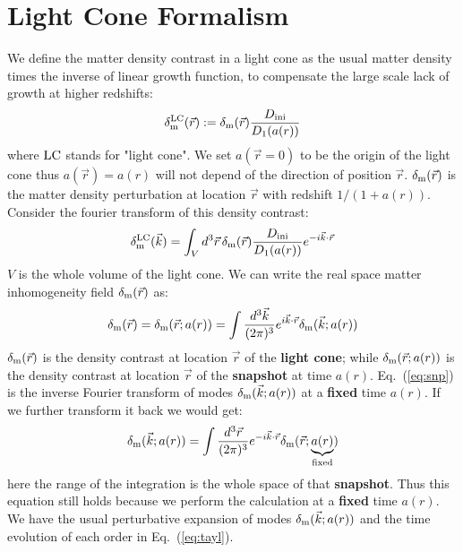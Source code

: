 \documentclass[prd,amsmath,amssymb,floatfix,superscriptaddress,nofootinbib,twocolumn]{revtex4-1}
\def\be{\begin{equation}}
\def\ee{\end{equation}}
\newcommand{\LC}{\rm LC}
\newcommand{\ini}{\rm ini}
\newcommand{\vrr}{\vec{r}}
\newcommand{\vk}{\vec{k}}
\newcommand{\ec}[1]{Eq.~(\ref{eq:#1})}
\newcommand{\eql}[1]{\label{eq:#1}}
\begin{document}
\section{Light Cone Formalism} \label{sec4}
We define the matter density contrast in a light cone as the usual matter density times the inverse of linear growth function, to compensate the large scale lack of growth at higher redshifts:
\be
\delta^{\LC}_{\rm m}(\vrr) :=\delta_{\rm m}(\vrr) \frac{D_{\ini}}{D_{1}(a(r))} \eql{LC}
\ee
where $\LC$ stands for "light cone". We set $a(\vrr=0)$ to be the origin of the light cone thus $a(\vrr)=a(r)$ will not depend of the direction of position $\vrr$. $\delta_{\rm m}(\vrr)$ is the matter density perturbation at location $\vrr$ with redshift $1/(1+a(r))$. Consider the fourier transform of this density contrast:
\be
\delta^{\LC}_{\rm m}(\vk) =\int_{V} d^3\vrr  \, \delta_{\rm m}(\vrr) \frac{D_{\ini}}{D_{1}(a(r))}  e^{-i\vk \cdot\vrr} \eql{LCM}
\ee
$V$ is the whole volume of the light cone. We can write the real space matter inhomogeneity field $\delta_{\rm m}(\vrr)$ as:
\be
\delta_{\rm m}(\vrr)=\delta_{\rm m}(\vrr;a(r))=\int \frac{d^3 \vk}{(2\pi)^3}e^{i\vk\cdot\vrr}\delta_{\rm m}(\vk;a(r))\eql{snp}
\ee 
$\delta_{\rm m}(\vrr)$ is the density contrast at location $\vrr$ of the \textbf{light cone}; while $\delta_{\rm m}(\vrr;a(r))$ is the density contrast at location $\vrr$ of the \textbf{snapshot} at time $a(r)$. \ec{snp} is the inverse Fourier transform of modes $\delta_{\rm m}(\vk;a(r))$ at a \textbf{fixed} time $a(r)$. If we further transform it back we would get:
\be 
\delta_{\rm m}(\vk;a(r))=\int \frac{d^3 \vrr}{(2\pi)^3}e^{-i\vk\cdot\vrr}\delta_{\rm m}(\vrr;\underbrace{a(r)}_{\rm fixed})
\ee 
here the range of the integration is the whole space of that \textbf{snapshot}. Thus this equation still holds because we perform the calculation at a \textbf{fixed} time $a(r)$. We have the usual perturbative expansion of modes $\delta_{\rm m}(\vk;a(r))$ and the time evolution of each order in \ec{tayl}.
\end{document}
